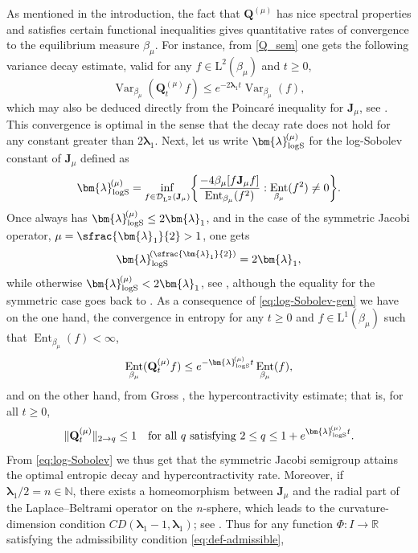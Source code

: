 \documentclass[JEP,XML,SOM,Unicode]{cedram}
\theoremstyle{plain}
\theoremstyle{definition}
\DeclareMathOperator{\Var}{Var}
\DeclareMathOperator{\Ent}{Ent}
\newcommand{\N}{\mathbb{N}}
\newcommand{\R}{\mathbb{R}}
\newcommand{\calD}{\mathcal{D}}
\newcommand{\Leb}{\mathrm{L}}
\newcommand{\calJd}{\mathbf{J}}
\newcommand{\lam}{{\bm{\lambda}_1}}
\newcommand{\logSob}[1][\mo]{\bm{\lambda}_{\mathrm{logS}}^{\hspace{-0.06cm}(#1)}}
\newcommand{\Q}[1][\mo]{\mathbf{Q}^{({#1})}}
\newcommand{\gab}[1][\lam,\mo]{{\beta_{#1}}}
\let\mo\mu
\begin{document}
\begin{appendix}
As mentioned in the introduction, the fact that $\Q$ has nice spectral properties and satisfies certain functional inequalities gives quantitative rates of convergence to the equilibrium measure $\gab[\mo]$. For instance, from \eqref{Q_sem} one gets the following variance decay estimate, valid for any $f \in \Leb^2(\gab[\mo])$ and $t \geq 0$,
\begin{equation*}
\Var_{\gab[\mo]}(\Q_t f ) \leq e^{-2\lam t} \Var_{\gab[\mo]}(f),
\end{equation*}
which may also be deduced directly from the Poincaré inequality for $\calJd_\mo$, see \cite[Chap.\,4.2]{Bakry_Book}. This convergence is optimal in the sense that the decay rate does not hold for any constant greater than $2\lam$. Next, let us write $\logSob[\mo]$ for the log-Sobolev constant of $\calJd_\mo$ defined as
\begin{equation}
\label{eq:log-Sobolev-gen}
\logSob[\mo] = \inf_{f \in \calD_{\Leb^2}(\calJd_\mo)} \biggl\{ \frac{-4\gab[\mo] [f \calJd_\mo f]}{\Ent_{\gab[\mo]} (f^2)} :\Ent_{\gab[\mo]} (f^2) \neq 0 \biggr\}.
\end{equation}
Once always has $\logSob[\mo] \leq 2\lam$, and in the case of the symmetric Jacobi operator, \ie
$\mo = \sfrac{\lam}{2} > 1$, one gets
\begin{equation}
\label{eq:log-Sobolev}
\logSob[\sfrac{\lam}{2}] = 2\lam,
\end{equation}
while otherwise $\logSob[\mo] < 2\lam$, see \eg \cite{fontenas:1998}, although the equality for the symmetric case goes back to \cite{pearson:1992}. As a consequence of \eqref{eq:log-Sobolev-gen} we have on the one hand, the convergence in entropy for any $t \geq 0$ and $f \in \Leb^1(\gab[\mo])$ such that $\Ent_{\gab[\mo]}(f) < \infty$,
\begin{equation*}
\Ent_{\gab[\mo]} (\Q[\mo]_tf) \leq e^{-\logSob[\mo] t} \Ent_{\gab[\mo]} (f),
\end{equation*}
and on the other hand, from Gross \cite{Gross}, the hypercontractivity estimate; that is, for all $t\geq 0$,
\begin{equation*}
\|\Q[\mo]_t\|_{2 \to q} \leq 1\quad \textrm{for all $q$ satisfying } 2\leq q \leq 1+e^{ \logSob[\mo] t}.
\end{equation*}
From \eqref{eq:log-Sobolev} we thus get that the symmetric Jacobi semigroup attains the optimal entropic decay and hypercontractivity rate. Moreover, if $\lam/2 = n \in \N$, there exists a homeomorphism between $\calJd_\mo$ and the radial part of the Laplace--Beltrami operator on the $n$-sphere, which leads to the curvature-dimension condition $CD(\lam-1,\lam)$; see \cite{Bakry_Book}. Thus for any function $\Phi \colon I \to \R$ satisfying the admissibility condition \eqref{eq:def-admissible},

\end{appendix}
\end{document}
